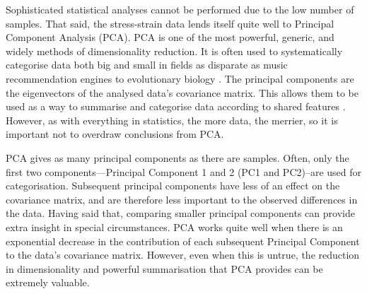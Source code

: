 Sophisticated statistical analyses cannot be performed due to the low number of samples. That said, the stress-strain data lends itself quite well to Principal Component Analysis (PCA). PCA is one of the most powerful, generic, and widely methods of dimensionality reduction. It is often used to systematically categorise data both big and small in fields as disparate as music recommendation engines to evolutionary biology \cite{pcamusic,pcaBio}. The principal components are the eigenvectors of the analysed data's covariance matrix. This allows them to be used as a way to summarise and categorise data according to shared features \cite{pca1}. However, as with everything in statistics, the more data, the merrier, so it is important not to overdraw conclusions from PCA.

PCA gives as many principal components as there are samples. Often, only the first two components---Principal Component 1 and 2 (PC1 and PC2)--are used for categorisation. Subsequent principal components have less of an effect on the covariance matrix, and are therefore less important to the observed differences in the data. Having said that, comparing smaller principal components can provide extra insight in special circumstances. PCA works quite well when there is an exponential decrease in the contribution of each subsequent Principal Component to the data's covariance matrix. However, even when this is untrue, the reduction in dimensionality and powerful summarisation that PCA provides can be extremely valuable.

